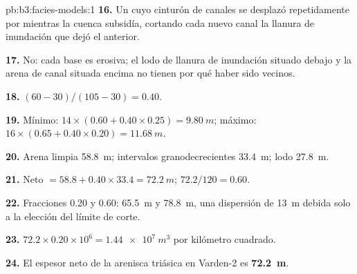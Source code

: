 \begin{solution}{pb:b3:facies-models:1}
\textbf{16.} Un  cuyo cinturón de canales se desplazó repetidamente por
 mientras la cuenca subsidía, cortando cada nuevo canal
la llanura de inundación que dejó el anterior.

\textbf{17.} No: cada base es erosiva; el lodo de llanura de inundación situado debajo y la
arena de canal situada encima no tienen por qué haber sido vecinos.

\textbf{18.} $(60 - 30)/(105 - 30) = 0.40$.

\textbf{19.} Mínimo: $14\times(0.60 + 0.40\times0.25) = \qty{9.80}{m}$;
máximo: $16\times(0.65 + 0.40\times0.20) = \qty{11.68}{m}$.

\textbf{20.} Arena limpia \qty{58.8}{m}; intervalos granodecrecientes \qty{33.4}{m}; lodo
\qty{27.8}{m}.

\textbf{21.} Neto $= 58.8 + 0.40\times33.4 = \qty{72.2}{m}$; 
$72.2/120 = 0.60$.

\textbf{22.} Fracciones 0.20 y 0.60: \qty{65.5}{m} y \qty{78.8}{m}, una
dispersión de \qty{13}{m} debida solo a la elección del límite de corte.

\textbf{23.} $72.2\times0.20\times10^6 = \qty{1.44e7}{m^3}$ por
kilómetro cuadrado.

\textbf{24.} El espesor neto de la arenisca triásica en Varden-2 es
\textbf{\qty[text-series-to-math=true]{72.2}{m}}.
\end{solution}
